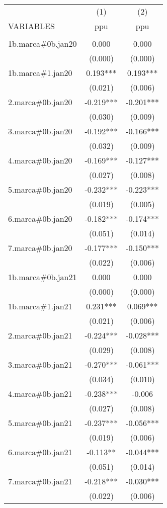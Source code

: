 \begin{tabular}{lcc} \hline
 & (1) & (2) \\
VARIABLES & ppu & ppu \\ \hline
 &  &  \\
1b.marca\#0b.jan20 & 0.000 & 0.000 \\
 & (0.000) & (0.000) \\
1b.marca\#1.jan20 & 0.193*** & 0.193*** \\
 & (0.021) & (0.006) \\
2.marca\#0b.jan20 & -0.219*** & -0.201*** \\
 & (0.030) & (0.009) \\
3.marca\#0b.jan20 & -0.192*** & -0.166*** \\
 & (0.032) & (0.009) \\
4.marca\#0b.jan20 & -0.169*** & -0.127*** \\
 & (0.027) & (0.008) \\
5.marca\#0b.jan20 & -0.232*** & -0.223*** \\
 & (0.019) & (0.005) \\
6.marca\#0b.jan20 & -0.182*** & -0.174*** \\
 & (0.051) & (0.014) \\
7.marca\#0b.jan20 & -0.177*** & -0.150*** \\
 & (0.022) & (0.006) \\
1b.marca\#0b.jan21 & 0.000 & 0.000 \\
 & (0.000) & (0.000) \\
1b.marca\#1.jan21 & 0.231*** & 0.069*** \\
 & (0.021) & (0.006) \\
2.marca\#0b.jan21 & -0.224*** & -0.028*** \\
 & (0.029) & (0.008) \\
3.marca\#0b.jan21 & -0.270*** & -0.061*** \\
 & (0.034) & (0.010) \\
4.marca\#0b.jan21 & -0.238*** & -0.006 \\
 & (0.027) & (0.008) \\
5.marca\#0b.jan21 & -0.237*** & -0.056*** \\
 & (0.019) & (0.006) \\
6.marca\#0b.jan21 & -0.113** & -0.044*** \\
 & (0.051) & (0.014) \\
7.marca\#0b.jan21 & -0.218*** & -0.030*** \\
 & (0.022) & (0.006) \\

\end{tabular}
